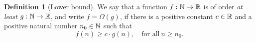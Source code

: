 \documentclass[12pt,phd,lfcs,twoside,openright,logo,leftchapter,normalheadings]{infthesis}
\theoremstyle{plain}
\theoremstyle{definition}
\newtheorem{definition}[theorem]{Definition}
\begin{document}
\begin{definition}[Lower bound]
  We say that a function $f : \mathbb{N} \to \mathbb{R}$ is of order \emph{at least}
  $g : \mathbb{N} \to \mathbb{R}$, and write $f = \Omega(g)$, if there is a positive
  constant $c \in \mathbb{R}$ and a positive natural number $n_0 \in \mathbb{N}$ such
  that
  \[
    f(n) \geq c \cdot g(n),\quad \text{for all}~n \geq n_0.
  \]
\end{definition}

\end{document}
